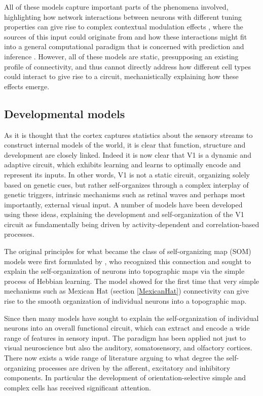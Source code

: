 All of these models capture important parts of the phenomena involved,
highlighting how network interactions between neurons with different
tuning properties can give rise to complex contextual modulation
effects \citep{Li2002}, where the sources of this input could
originate from \citep{Schwabe2006} and how these interactions might
fit into a general computational paradigm that is concerned with
prediction and inference \citep{Spratling2010, Coen2015}. However, all
of these models are static, presupposing an existing profile of
connectivity, and thus cannot directly address how different cell
types could interact to give rise to a circuit, mechanistically
explaining how these effects emerge.

\subsection{Developmental models} \label{devmodels}


As it is thought that the cortex captures statistics about the sensory
streams to construct internal models of the world, it is clear that
function, structure and development are closely linked. Indeed it is
now clear that V1 is a dynamic and adaptive circuit, which exhibits
learning and learns to optimally encode and represent its inputs. In
other words, V1 is not a static circuit, organizing solely based on
genetic cues, but rather self-organizes through a complex interplay of
genetic triggers, intrinsic mechanisms such as retinal waves and
perhaps most importantly, external visual input. A number of models
have been developed using these ideas, explaining the development and
self-organization of the V1 circuit as fundamentally being driven by
activity-dependent and correlation-based processes.

The original principles for what became the class of self-organizing
map (SOM) models were first formulated by \citep{VonderMalsburg1973},
who recognized this connection and sought to explain the
self-organization of neurons into topographic maps via the simple
process of Hebbian learning. The \cite{VonderMalsburg1973} model
showed for the first time that very simple mechanisms such as
Mexican Hat (section \ref{MexicanHat})
connectivity can give rise to the smooth organization
of individual neurons into a topographic map.

Since then many models have sought to explain the
self-organization of individual neurons into an overall functional
circuit, which can extract and encode a wide range of features in
sensory input. The paradigm has been applied not just to visual
neuroscience but also the auditory, somatosensory, and olfactory
cortices. There now exists a wide range of literature arguing to what
degree the self-organizing processes are driven by the afferent,
excitatory and inhibitory components. In particular the development of
orientation-selective simple and complex cells has received
significant attention.

